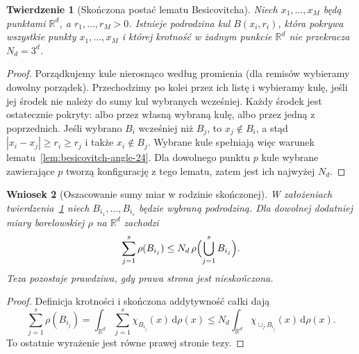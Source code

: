 \documentclass[11pt,a4paper,oneside]{book}
\numberwithin{equation}{chapter}
\theoremstyle{plain}
\newtheorem{twierdzenie}{Twierdzenie}[chapter]
\newtheorem{wniosek}[twierdzenie]{Wniosek}
\theoremstyle{definition}
\theoremstyle{remark}
\begin{document}
\begin{twierdzenie}[Skończona postać lematu Besicovitcha]
\label{thm:besicovitch-finite-24}
Niech $x_1,\ldots,x_M$ będą punktami $\mathbb R^d$,
a $r_1,\ldots,r_M>0$. Istnieje podrodzina kul
$B(x_i,r_i)$, która pokrywa wszystkie punkty
$x_1,\ldots,x_M$ i której krotność w żadnym punkcie
$\mathbb R^d$ nie przekracza $N_d=3^d$.
\end{twierdzenie}
\begin{proof}
Porządkujemy kule nierosnąco według promienia (dla remisów
wybieramy dowolny porządek). Przechodzimy po kolei przez
ich listę i wybieramy kulę, jeśli jej środek nie należy
do sumy kul wybranych wcześniej. Każdy środek jest ostatecznie
pokryty: albo przez własną wybraną kulę, albo przez jedną
z poprzednich. Jeśli wybrano $B_i$ wcześniej niż $B_j$,
to $x_j\notin B_i$, a stąd $|x_i-x_j|\ge r_i\ge r_j$
i także $x_i\notin B_j$. Wybrane kule spełniają więc
warunek lematu~\ref{lem:besicovitch-angle-24}.
Dla dowolnego punktu $p$ kule wybrane zawierające $p$
tworzą konfigurację z tego lematu, zatem jest ich najwyżej
$N_d$.
\end{proof}

\begin{wniosek}[Oszacowanie sumy miar w rodzinie skończonej]
\label{cor:finite-besicovitch-measure-24}
W założeniach twierdzenia~\ref{thm:besicovitch-finite-24}
niech $B_{i_1},\ldots,B_{i_s}$ będzie wybraną podrodziną.
Dla dowolnej dodatniej miary borelowskiej $\rho$
na $\mathbb R^d$ zachodzi
\[
 \sum_{j=1}^s\rho(B_{i_j})
 \le N_d\,\rho\Bigl(\bigcup_{j=1}^s B_{i_j}\Bigr).
\]
Teza pozostaje prawdziwa, gdy prawa strona jest nieskończona.
\end{wniosek}
\begin{proof}
Definicja krotności i skończona addytywność całki dają
\[
 \sum_{j=1}^s\rho(B_{i_j})
 =\int_{\mathbb R^d}\sum_{j=1}^s\chi_{B_{i_j}}(x)
 \,\mathrm d\rho(x)
 \le N_d\int_{\mathbb R^d}
 \chi_{\cup_jB_{i_j}}(x)\,\mathrm d\rho(x).
\]
To ostatnie wyrażenie jest równe prawej stronie tezy.
\end{proof}
\end{document}
